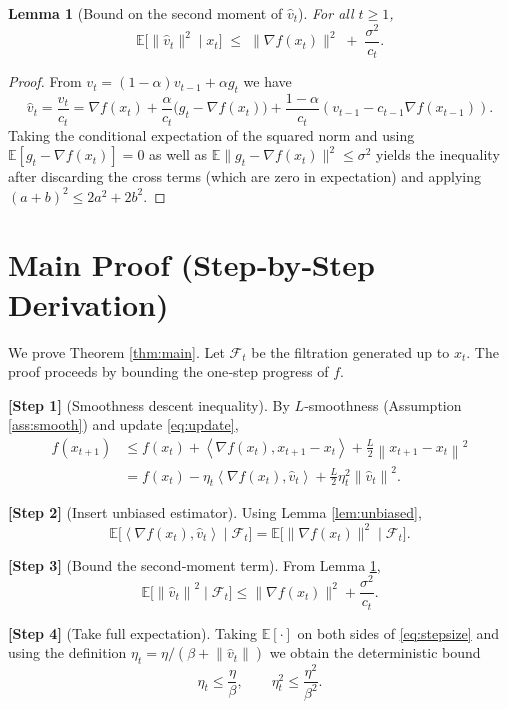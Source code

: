 \documentclass[11pt]{article}
\newtheorem{lemma}{Lemma}
\newcommand{\E}{\mathbb{E}}
\newcommand{\norm}[1]{\left\lVert#1\right\rVert}
\newcommand{\inner}[2]{\left\langle #1,#2\right\rangle}
\newcommand{\grad}{\nabla}
\begin{document}
\begin{lemma}[Bound on the second moment of $\hat v_{t}$]\label{lem:second}
For all $t\ge 1$,
\[
\E\!\big[\|\hat v_{t}\|^{2}\mid x_{t}\big]
\;\le\;
\|\grad f(x_{t})\|^{2} \;+\; \frac{\sigma^{2}}{c_{t}} .
\]
\end{lemma}
\begin{proof}
From $v_{t}= (1-\alpha)v_{t-1}+ \alpha g_{t}$ we have
\[
\hat v_{t}= \frac{v_{t}}{c_{t}}
= \grad f(x_{t}) + \frac{\alpha}{c_{t}}\big(g_{t}-\grad f(x_{t})\big)
+ \frac{1-\alpha}{c_{t}}(v_{t-1}-c_{t-1}\grad f(x_{t-1})).
\]
Taking the conditional expectation of the squared norm and using $\E[g_{t}-\grad f(x_{t})]=0$ as well as $\E\|g_{t}-\grad f(x_{t})\|^{2}\le\sigma^{2}$ yields the inequality after discarding the cross terms (which are zero in expectation) and applying $(a+b)^{2}\le 2a^{2}+2b^{2}$.
\end{proof}

\section*{Main Proof (Step‑by‑Step Derivation)}
We prove Theorem \ref{thm:main}. Let $\mathcal{F}_{t}$ be the filtration generated up to $x_{t}$. The proof proceeds by bounding the one‑step progress of $f$.

\noindent\textbf{[Step 1]} (Smoothness descent inequality). By $L$‑smoothness (Assumption \ref{ass:smooth}) and update \eqref{eq:update},
\[
\begin{aligned}
f(x_{t+1})
&\le f(x_{t}) + \inner{\grad f(x_{t})}{x_{t+1}-x_{t}}
   + \frac{L}{2}\norm{x_{t+1}-x_{t}}^{2} \\
&= f(x_{t}) - \eta_{t}\inner{\grad f(x_{t})}{\hat v_{t}}
   + \frac{L}{2}\eta_{t}^{2}\norm{\hat v_{t}}^{2}.
\end{aligned}
\tag{1}
\]

\noindent\textbf{[Step 2]} (Insert unbiased estimator). Using Lemma \ref{lem:unbiased},
\[
\E\!\big[\inner{\grad f(x_{t})}{\hat v_{t}}\mid\mathcal{F}_{t}\big]
= \E\!\big[\|\grad f(x_{t})\|^{2}\mid\mathcal{F}_{t}\big].
\tag{2}
\]

\noindent\textbf{[Step 3]} (Bound the second‑moment term). From Lemma \ref{lem:second},
\[
\E\!\big[\norm{\hat v_{t}}^{2}\mid\mathcal{F}_{t}\big]
\le \|\grad f(x_{t})\|^{2} + \frac{\sigma^{2}}{c_{t}} .
\tag{3}
\]

\noindent\textbf{[Step 4]} (Take full expectation). Taking $\E[\cdot]$ on both sides of \eqref{eq:stepsize} and using the definition $\eta_{t}= \eta/(\beta+\norm{\hat v_{t}})$ we obtain the deterministic bound
\[
\eta_{t}\le \frac{\eta}{\beta},
\qquad
\eta_{t}^{2}\le \frac{\eta^{2}}{\beta^{2}} .
\tag{4}
\]
\end{document}
